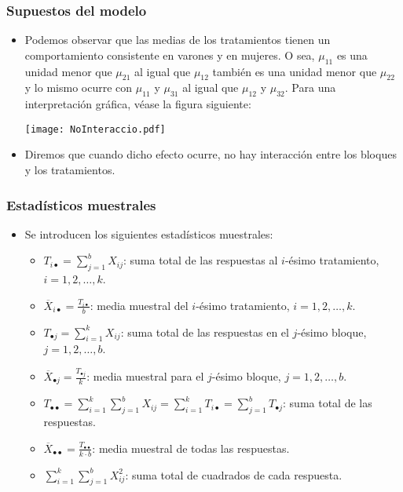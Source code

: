 \begin{frame}
\frametitle{Supuestos del modelo}
\begin{itemize}
\item<2-> Podemos observar que las medias de los tratamientos tienen un comportamiento consistente en varones y en mujeres. O sea, $\mu_{11}$ es una unidad menor que $\mu_{21}$ al igual que $\mu_{12}$ también es una unidad menor que $\mu_{22}$ y lo mismo ocurre con $\mu_{11}$ y $\mu_{31}$ al igual que $\mu_{12}$ y $\mu_{32}$. Para una interpretación gráfica, véase la figura siguiente:
\begin{center}
\texttt{[image: NoInteraccio.pdf]} 
\end{center}
\item<3-> Diremos que cuando dicho efecto ocurre, no hay interacción entre los bloques y los tratamientos.
\end{itemize}
\end{frame}
\begin{frame}
\frametitle{Estadísticos muestrales}
\begin{itemize}
\item<2-> Se introducen los siguientes estadísticos muestrales:
\begin{itemize}
\item<3-> $T_{i\bullet} = \sum_{j=1}^b X_{ij}$: suma total de las respuestas al $i$-ésimo tratamiento, $i=1,2,\ldots,k$.
\item<4-> $\overline{X}_{i\bullet} =\frac{T_{i\bullet}}{b}$: media muestral del $i$-ésimo tratamiento, $i=1,2,\ldots,k$.
\item<5-> $T_{\bullet j}=\sum_{i=1}^k X_{ij}$: suma total de las respuestas en el $j$-ésimo bloque, $j=1,2,\ldots,b$.
\item<6-> $\overline{X}_{\bullet j} =\frac{T_{\bullet j}}{k}$: media muestral para el $j$-ésimo bloque, $j=1,2,\ldots,b$.
\item<7-> $T_{\bullet\bullet}=\sum_{i=1}^k\sum_{j=1}^b X_{ij}=\sum_{i=1}^k T_{i\bullet}= \sum_{j=1}^b T_{\bullet j}$: suma total de las respuestas.
\item<8-> $\overline{X}_{\bullet\bullet}=\frac{T_{\bullet\bullet}}{k\cdot b}$: media muestral de todas las respuestas.
\item<9-> $\sum_{i=1}^k\sum_{j=1}^b X_{ij}^2$: suma total de cuadrados de cada respuesta.
\end{itemize}
\end{itemize}
\end{frame}


